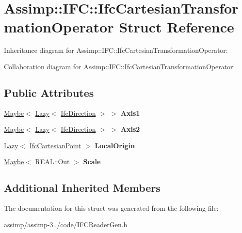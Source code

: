 \hypertarget{struct_assimp_1_1_i_f_c_1_1_ifc_cartesian_transformation_operator}{\section{Assimp\+:\+:I\+F\+C\+:\+:Ifc\+Cartesian\+Transformation\+Operator Struct Reference}
\label{struct_assimp_1_1_i_f_c_1_1_ifc_cartesian_transformation_operator}
}


Inheritance diagram for Assimp\+:\+:I\+F\+C\+:\+:Ifc\+Cartesian\+Transformation\+Operator\+:


Collaboration diagram for Assimp\+:\+:I\+F\+C\+:\+:Ifc\+Cartesian\+Transformation\+Operator\+:
\subsection*{Public Attributes}
\begin{DoxyCompactItemize}
\item 
\hypertarget{struct_assimp_1_1_i_f_c_1_1_ifc_cartesian_transformation_operator_a7109e5e6555df5a998b9174825766ee8}{\hyperlink{struct_assimp_1_1_s_t_e_p_1_1_maybe}{Maybe}$<$ \hyperlink{struct_assimp_1_1_s_t_e_p_1_1_lazy}{Lazy}$<$ \hyperlink{struct_assimp_1_1_i_f_c_1_1_ifc_direction}{Ifc\+Direction} $>$ $>$ {\bfseries Axis1}}\label{struct_assimp_1_1_i_f_c_1_1_ifc_cartesian_transformation_operator_a7109e5e6555df5a998b9174825766ee8}

\item 
\hypertarget{struct_assimp_1_1_i_f_c_1_1_ifc_cartesian_transformation_operator_a95a3a7a329c26d9afa1bed04536b2f27}{\hyperlink{struct_assimp_1_1_s_t_e_p_1_1_maybe}{Maybe}$<$ \hyperlink{struct_assimp_1_1_s_t_e_p_1_1_lazy}{Lazy}$<$ \hyperlink{struct_assimp_1_1_i_f_c_1_1_ifc_direction}{Ifc\+Direction} $>$ $>$ {\bfseries Axis2}}\label{struct_assimp_1_1_i_f_c_1_1_ifc_cartesian_transformation_operator_a95a3a7a329c26d9afa1bed04536b2f27}

\item 
\hypertarget{struct_assimp_1_1_i_f_c_1_1_ifc_cartesian_transformation_operator_a7f9d174093c35089e62f74c4e1b6e2ff}{\hyperlink{struct_assimp_1_1_s_t_e_p_1_1_lazy}{Lazy}$<$ \hyperlink{struct_assimp_1_1_i_f_c_1_1_ifc_cartesian_point}{Ifc\+Cartesian\+Point} $>$ {\bfseries Local\+Origin}}\label{struct_assimp_1_1_i_f_c_1_1_ifc_cartesian_transformation_operator_a7f9d174093c35089e62f74c4e1b6e2ff}

\item 
\hypertarget{struct_assimp_1_1_i_f_c_1_1_ifc_cartesian_transformation_operator_a9e38b131634c7fc8ef433ce2d767eb49}{\hyperlink{struct_assimp_1_1_s_t_e_p_1_1_maybe}{Maybe}$<$ R\+E\+A\+L\+::\+Out $>$ {\bfseries Scale}}\label{struct_assimp_1_1_i_f_c_1_1_ifc_cartesian_transformation_operator_a9e38b131634c7fc8ef433ce2d767eb49}

\end{DoxyCompactItemize}
\subsection*{Additional Inherited Members}


The documentation for this struct was generated from the following file\+:\begin{DoxyCompactItemize}
\item 
assimp/assimp-\/3../code/I\+F\+C\+Reader\+Gen.\+h\end{DoxyCompactItemize}
